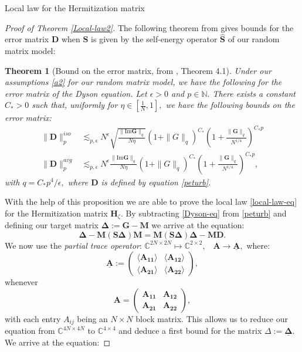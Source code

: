 \documentclass[11pt, a4paper, oneside]{book}
\numberwithin{equation}{chapter}
\newcommand{\beq}{\begin{equation}}
\newcommand{\eeq}{\end{equation}}
\newtheorem{thm}{Theorem}[section]
\begin{document}
\begin{section}{Local law for the Hermitization matrix}
\begin{proof}[Proof of Theorem \ref{Local-law2}]
The following theorem from \cite{erdHos2019random} gives bounds for the error matrix $\mathbf{D}$ when $\bm{S}$ is given by the self-energy operator $\bm{\hat{S}}$ of our random matrix model:
%
\pagebreak
%
\begin{thm}[Bound on the error matrix, from \cite{erdHos2019random}, Theorem 4.1] \label{t:errorbounds}
Under our assumptions \ref{a2} for our random matrix model, we have the following for the error matrix of the Dyson equation. Let $\epsilon>0$ and $p \in \mathbb{N}.$ There exists a constant $C_*>0$ such that, uniformly for $\eta \in [\frac{1}{N},1],$ we have the following bounds on the error matrix:
\begin{align} \label{error-bounds}
    \|\mathbf{D}\|_p^{iso} &\lesssim_{p,\epsilon} N^\epsilon \sqrt{\frac{\|\mathrm{Im}\mathbf{G}\|_q}{N\eta}}(1+\|G\|_q)^{C_*}\left (1+\frac{\|\mathbf{G}\|_q}{N^{1/4}} \right )^{C_*p} \\
    \|\mathbf{D}\|_p^{avg} &\lesssim_{p,\epsilon} N^\epsilon {\frac{\|\mathrm{Im}\mathbf{G}\|_q}{N\eta}}(1+\|G\|_q)^{C_*}\left (1+\frac{\|\mathbf{G}\|_q}{N^{1/4}} \right )^{C_*p},
\end{align}
with $q=C_*p^4/\epsilon,$ where $\mathbf{D}$ is defined by equation \eqref{peturb}.
\end{thm}
%
With the help of this proposition we are able to prove the local law \eqref{local-law-eq} for the Hermitization matrix $\mathbf{H}_{\zeta}.$ By subtracting \eqref{Dyson-eq} from \eqref{peturb} and defining our target matrix $\mathbf{\Delta}:= \mathbf{G} - \mathbf{M} $ we arrive at the equation:
%
\beq \label{Delta-eq}
\mathbf{\Delta} - \mathbf{M} (\bm{S} \mathbf{\Delta}) \mathbf{M} = \mathbf{M} (\bm{S} \mathbf{\Delta}) \mathbf{\Delta} - \mathbf{M} \mathbf{D}.
\eeq
%
We now use the \textit{partial trace operator}: $\mathbb{C}^{2N \times 2N} \mapsto \mathbb{C}^{2 \times 2},$ \ $\mathbf{A} \to \underline{\mathbf{A}},$ where:
\[
\underline{\mathbf{A}} := \begin{pmatrix}
    \langle \mathbf{A_{11}} \rangle & \langle \mathbf{A_{12}} \rangle \\ \langle \mathbf{A_{21}} \rangle & \langle \mathbf{A_{22}} \rangle
\end{pmatrix}, \]
whenever \[
{\mathbf{A}} = \begin{pmatrix}
    \mathbf{A_{11}} & \mathbf{A_{12}} \\ \mathbf{A_{21}} & \mathbf{A_{22}}
\end{pmatrix} ,
\]
with each entry $A_{ij}$ being an $N \times N$ block matrix. This allows us to reduce our equation from $\mathbb{C}^{4N \times 4N}$ to $\mathbb{C}^{4 \times 4}$ and deduce a first bound for the matrix $\Delta:= \underline{\mathbf{\Delta}}.$ We arrive at the equation:

\end{proof}
\end{section}
\end{document}
